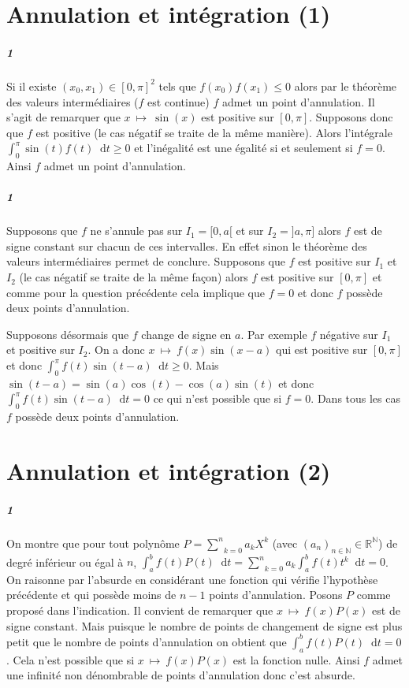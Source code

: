 \documentclass[10pt,a4paper]{article}
\newcommand{\seq}[2]{\left( #1_{#2} \right)_{#2 \in \mathbb{N}} }
\newcommand{\intt}[4]{\int_{#1}^{#2} #3 \mathop{}\!\mathrm{d} #4}
\newcommand{\summ}[2]{\underset{#1}{\overset{#2}{\sum}}}
\begin{document}
\section{Annulation et intégration (1)}
\subparagraph{1} Si il existe $(x_0,x_1) \in [0,\pi]^2$ tels que $f(x_0)f(x_1) \le 0$ alors par le théorème des valeurs intermédiaires ($f$ est continue) $f$ admet un point d'annulation. 
Il s'agit de remarquer que $x \ \mapsto \ \sin(x)$ est positive sur $[0, \pi]$. Supposons donc que $f$ est positive (le cas négatif se traite de la même manière). Alors l'intégrale $\intt{0}{\pi}{\sin(t) f(t)}{t} \ge 0$ et l'inégalité est une égalité si et seulement si $f=0$. Ainsi $f$ admet un point d'annulation.

\subparagraph{1}Supposons que $f$ ne s'annule pas sur $I_1 = [0,a[$ et sur $I_2 = ]a,\pi]$ alors $f$ est de signe constant sur chacun de ces intervalles. En effet sinon le théorème des valeurs intermédiaires permet de conclure. Supposons que $f$ est positive sur $I_1$ et $I_2$ (le cas négatif se traite de la même façon) alors $f$ est positive sur $[0,  \pi]$ et comme pour la question précédente cela implique que $f=0$ et donc $f$ possède deux points d'annulation. 

Supposons désormais que $f$ change de signe en $a$. Par exemple $f$ négative sur $I_1$ et positive sur $I_2$. On a donc $x \ \mapsto \ f(x) \sin(x-a)$ qui est positive sur $[0,\pi]$ et donc $\intt{0}{\pi}{f(t) \sin(t-a)}{t} \ge 0$. Mais $\sin(t-a) = \sin(a) \cos(t) - \cos(a) \sin(t)$ et donc $\intt{0}{\pi}{f(t) \sin(t-a)}{t} = 0$ ce qui n'est possible que si $f = 0$. Dans tous les cas $f$ possède deux points d'annulation.

\section{Annulation et intégration (2)}
\subparagraph{1} On montre que pour tout polynôme $P = \summ{k=0}{n}{a_kX^k}$ (avec $\seq{a}{n} \in \mathbb{R}^{\mathbb{N}}$) de degré inférieur ou égal à $n$, $\intt{a}{b}{f(t)P(t)}{t} = \summ{k=0}{n}{a_k \intt{a}{b}{f(t)t^k}{t}} = 0$. On raisonne par l'absurde en considérant une fonction qui vérifie l'hypothèse précédente et qui possède moins de $n-1$ points d'annulation. Posons $P$ comme proposé dans l'indication. Il convient de remarquer que $x \ \mapsto \ f(x)P(x)$ est de signe constant. Mais puisque le nombre de points de changement de signe est plus petit que le nombre de points d'annulation on obtient que $\intt{a}{b}{f(t)P(t)}{t} = 0$. Cela n'est possible que si $x \ \mapsto \ f(x)P(x)$ est la fonction nulle. Ainsi $f$ admet une infinité non dénombrable de points d'annulation donc c'est absurde.
\end{document}
